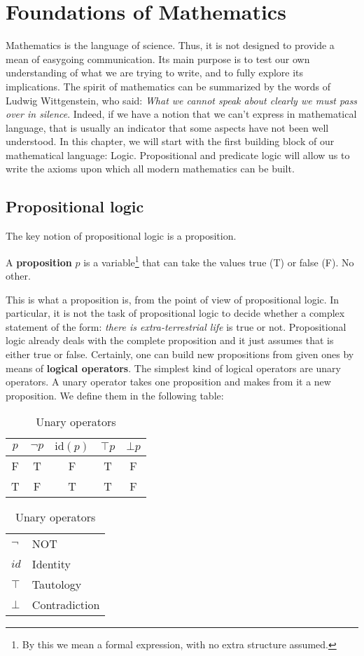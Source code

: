 \documentclass[root.tex]{subfiles}
\begin{document}
\chapter{Foundations of Mathematics}
Mathematics is the language of science. Thus, it is not designed to provide a mean of easygoing communication. Its main purpose is to test our own understanding of what we are trying to write, and to fully explore its implications. The spirit of mathematics can be summarized by the words of Ludwig Wittgenstein, who said: \emph{What we cannot speak about clearly we must pass over in silence}. Indeed, if we have a notion that we can't express in mathematical language, that is usually an indicator that some aspects have not been well understood. In this chapter, we will start with the first building block of our mathematical language: Logic. Propositional and predicate logic will allow us to write the axioms upon which all modern mathematics can be built. 

\section{Propositional logic}%
The key notion of propositional logic is a proposition. 
\begin{mydef}
  A \textbf{proposition} $p$ is a variable\footnote{By this we mean a formal expression, with no extra structure assumed.} that can take the values true (T) or false (F). No other. 
\end{mydef}
This is what a proposition is, from the point of view of propositional logic. In particular, it is not the task of propositional logic to decide whether a complex statement of the form: \emph{there is extra-terrestrial life} is true or not. Propositional logic already deals with the complete proposition and it just assumes that is either true or false. Certainly, one can build new propositions from given ones by means of \textbf{logical operators}. The simplest kind of logical operators are unary operators. A unary operator takes one proposition and makes from it a new proposition. We define them in the following table:
    \begin{table}[h]
      \centering
      \begin{tabular}{c||c|c|c|c}
        $p$ & $\neg p$ & $\mathrm{id}(p)$ & $\top p$ & $\bot p$ \\
        \hline
        \rule{0pt}{12pt} F & T & F & T & F\\
                         T & F & T & T & F
      \end{tabular}\qquad
      \begin{tabular}{ll}
        $\neg$ & NOT\\
        $id$   & Identity\\
        $\top$ & Tautology\\
        $\bot$ & Contradiction
      \end{tabular}
      \caption{Unary operators}
    \end{table}
\end{document}
